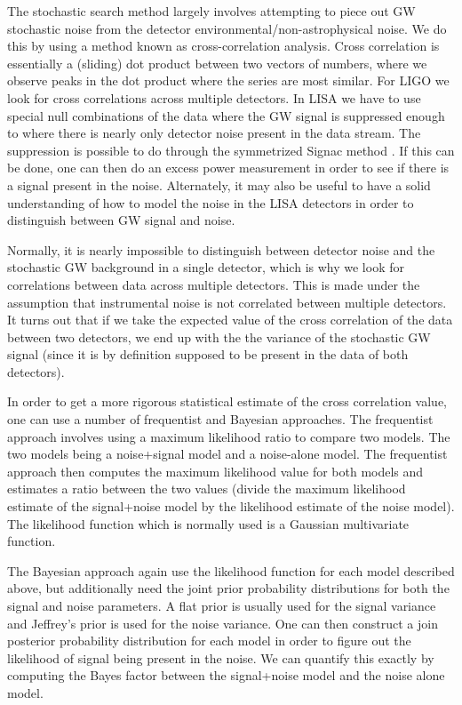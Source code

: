 %
The stochastic search method largely involves attempting to piece out \ac{GW} stochastic noise from the detector environmental/non-astrophysical noise. We do this by using a method known as cross-correlation analysis. Cross correlation is essentially a (sliding) dot product between two vectors of numbers, where we observe peaks in the dot product where the series are most similar. For \ac{LIGO} we look for cross correlations across multiple detectors. In \ac{LISA} we have to use special null combinations of the data where the \ac{GW} signal is suppressed enough to where there is nearly only detector noise present in the data stream. The suppression is possible to do through the symmetrized Signac method \cite{PhysRevD.64.062002}. If this can be done, one can then do an excess power measurement in order to see if there is a signal present in the noise. Alternately, it may also be useful to have a solid understanding of how to model the noise in the \ac{LISA} detectors in order to distinguish between \ac{GW} signal and noise. 

Normally, it is nearly impossible to distinguish between detector noise and the stochastic \ac{GW} background in a single detector, which is why we look for correlations between data across multiple detectors. This is made under the assumption that instrumental noise is not correlated between multiple detectors. It turns out that if we take the expected value of the cross correlation of the data between two detectors, we end up with the the variance of the stochastic \ac{GW} signal (since it is by definition supposed to be present in the data of both detectors).

%
%
In order to get a more rigorous statistical estimate of the cross correlation value, one can use a number of frequentist and Bayesian approaches. The frequentist approach involves using a maximum likelihood ratio to compare two models. The two models being a noise+signal model and a noise-alone model. The frequentist approach then computes the maximum likelihood value for both models and estimates a ratio between the two values (divide the maximum likelihood estimate of the signal+noise model by the likelihood estimate of the noise model). The likelihood function which is normally used is a Gaussian multivariate function.

The Bayesian approach again use the likelihood function for each model described above, but additionally need the joint prior probability distributions for both the signal and noise parameters. A flat prior is usually used for the signal variance and Jeffrey’s prior is used for the noise variance. One can then construct a join posterior probability distribution for each model in order to figure out the likelihood of signal being present in the noise. We can quantify this exactly by computing the Bayes factor between the signal+noise model and the noise alone model.


